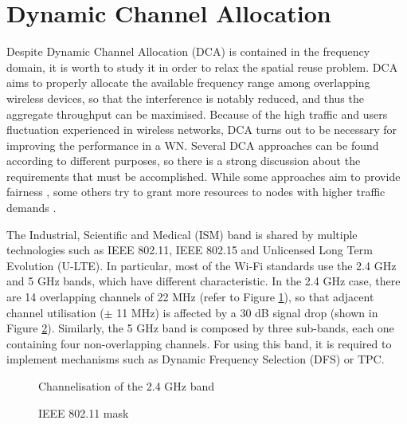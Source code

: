 \documentclass[12pt, a4paper,twoside]{tesi_upf}
\begin{document}
		\section{Dynamic Channel Allocation}		
		\label{section:dca}					
		Despite Dynamic Channel Allocation (DCA) is contained in the frequency domain, it is worth to study it in order to relax the spatial reuse problem. DCA aims to properly allocate the available frequency range among overlapping wireless devices, so that the interference is notably reduced, and thus the aggregate throughput can be maximised. Because of the high traffic and users fluctuation experienced in wireless networks, DCA turns out to be necessary for improving the performance in a WN. Several DCA approaches can be found according to different purposes, so there is a strong discussion about the requirements that must be accomplished. While some approaches aim to provide fairness \cite{ling2006joint}, some others try to grant more resources to nodes with higher traffic demands \cite{wertz2004automatic}.
		
		The Industrial, Scientific and Medical (ISM) band is shared by multiple technologies such as IEEE 802.11, IEEE 802.15 and Unlicensed Long Term Evolution (U-LTE). In particular, most of the Wi-Fi standards use the 2.4 GHz	and 5 GHz bands, which have different characteristic. In the 2.4 GHz case, there are 14 overlapping channels of 22 MHz (refer to Figure \ref{fig:channelisation_wifi}), so that adjacent channel utilisation ($\pm$ 11 MHz) is affected by a 30 dB signal drop (shown in Figure \ref{fig:80211ad_mask}). Similarly, the 5 GHz band is composed by three sub-bands, each one containing four non-overlapping channels. For using this band, it is required to implement mechanisms such as Dynamic Frequency Selection (DFS) or TPC.
		\begin{figure}[h!]
			\centering
			\caption{Channelisation of the 2.4 GHz band}
			\label{fig:channelisation_wifi}
		\end{figure}
		\begin{figure}[h!]
			\centering
			\caption{IEEE 802.11 mask}
			\label{fig:80211ad_mask}
		\end{figure}			
		
\end{document}
